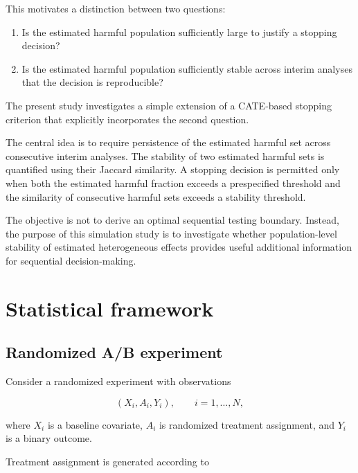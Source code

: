\documentclass[11pt,a4paper]{article}
\begin{document}
This motivates a distinction between two questions:

\begin{enumerate}
    \item Is the estimated harmful population sufficiently large to justify
    a stopping decision?
    \item Is the estimated harmful population sufficiently stable across
    interim analyses that the decision is reproducible?
\end{enumerate}

The present study investigates a simple extension of a CATE-based stopping
criterion that explicitly incorporates the second question.

The central idea is to require persistence of the estimated harmful set across
consecutive interim analyses. The stability of two estimated harmful sets is
quantified using their Jaccard similarity. A stopping decision is permitted
only when both the estimated harmful fraction exceeds a prespecified
threshold and the similarity of consecutive harmful sets exceeds a stability
threshold.

The objective is not to derive an optimal sequential testing boundary.
Instead, the purpose of this simulation study is to investigate whether
population-level stability of estimated heterogeneous effects provides useful
additional information for sequential decision-making.


\section{Statistical framework}

\subsection{Randomized A/B experiment}

Consider a randomized experiment with observations

\begin{equation}
(X_i,A_i,Y_i),
\qquad i=1,\ldots,N,
\end{equation}

where $X_i$ is a baseline covariate, $A_i$ is randomized treatment assignment,
and $Y_i$ is a binary outcome.

Treatment assignment is generated according to
\end{document}
